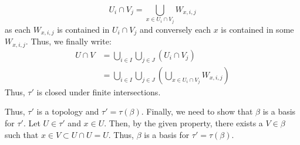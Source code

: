\documentclass[12pt]{article}
\begin{document}
\begin{solution}
\begin{enumerate}
        \[ U_i \cap V_j = \bigcup_{x \in U_i \cap V_j} W_{x, i,j}\]
        as each $W_{x, i, j}$ is contained in $U_i \cap V_j$ and conversely each $x$ is contained in some $W_{x, i, j}$. Thus, we finally write:
        \begin{align*}
            U \cap V &= \bigcup_{i \in I} \bigcup_{j \in J} (U_i \cap V_j) \\
            &= \bigcup_{i \in I} \bigcup_{j \in J} \left( \bigcup_{x \in U_i \cap V_j} W_{x, i, j} \right)
        \end{align*}        
        Thus, $\tau'$ is closed under finite intersections.  
    \end{enumerate}
    Thus, $\tau'$ is a topology and $\tau' = \tau(\beta)$. \bbni
    Finally, we need to show that $\beta$ is a basis for $\tau'$. Let $U \in \tau'$ and $x \in U$. Then, by the given property, there exists a $V \in \beta$ such that $x \in V \subset U \cap U = U$. Thus, $\beta$ is a basis for $\tau' = \tau(\beta)$.
\end{solution}
\newpage
\end{document}
